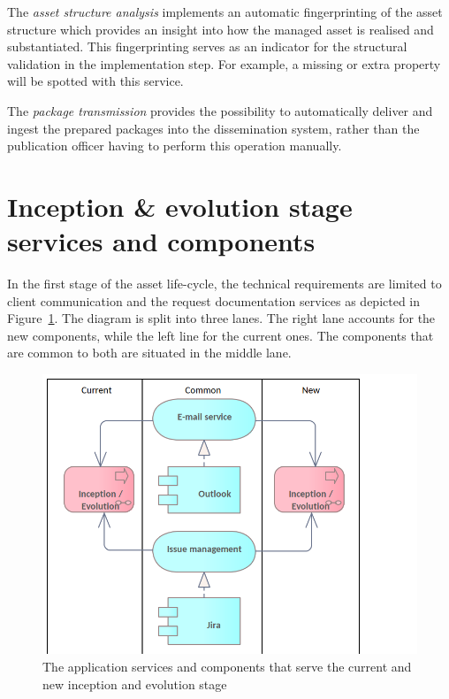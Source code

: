 	The \textit{asset structure analysis} implements an automatic fingerprinting of the asset structure which provides an insight into how the managed asset is realised and substantiated. This fingerprinting serves as an indicator for the structural validation in the implementation step. For example, a missing or extra property will be spotted with this service. 
	
	The \textit{package transmission} provides the possibility to automatically deliver and ingest the prepared packages into the dissemination system, rather than the publication officer having to perform this operation manually. 
	

	
	\section{Inception \& evolution stage services and components}
	\label{sec:evolution-application}
	
	In the first stage of the asset life-cycle, the technical requirements are limited to client communication and the request documentation services as depicted in \mbox{Figure \ref{fig:application-inception-evolution}}. The diagram is split into three lanes. The right lane accounts for the new components, while the left line for the current ones. The components that are common to both are situated in the middle lane. 

	\begin{figure}[h]
		\centering
		\includegraphics[width=.6\textwidth]{images/application/InceptionEvolution.png}
		\caption{The application services and components that serve the current and new inception and evolution stage}
		\label{fig:application-inception-evolution}
	\end{figure}
	
